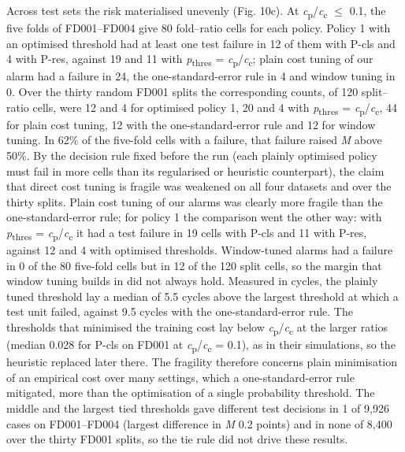 \documentclass[a4paper,fleqn,doubleblind]{cas-dc}
\begin{document}
Across test sets the risk materialised unevenly (Fig. 10c). At \textit{c}\textsubscript{p}/\textit{c}\textsubscript{c} $\le$ 0.1, the five folds of FD001--FD004 give 80 fold--ratio cells for each policy. Policy 1 with an optimised threshold had at least one test failure in 12 of them with P-cls and 4 with P-res, against 19 and 11 with \textit{p}\textsubscript{thres} = \textit{c}\textsubscript{p}/\textit{c}\textsubscript{c}; plain cost tuning of our alarm had a failure in 24, the one-standard-error rule in 4 and window tuning in 0. Over the thirty random FD001 splits the corresponding counts, of 120 split--ratio cells, were 12 and 4 for optimised policy 1, 20 and 4 with \textit{p}\textsubscript{thres} = \textit{c}\textsubscript{p}/\textit{c}\textsubscript{c}, 44 for plain cost tuning, 12 with the one-standard-error rule and 12 for window tuning. In 62\% of the five-fold cells with a failure, that failure raised \textit{M} above 50\%. By the decision rule fixed before the run (each plainly optimised policy must fail in more cells than its regularised or heuristic counterpart), the claim that direct cost tuning is fragile was weakened on all four datasets and over the thirty splits. Plain cost tuning of our alarms was clearly more fragile than the one-standard-error rule; for policy 1 the comparison went the other way: with \textit{p}\textsubscript{thres} = \textit{c}\textsubscript{p}/\textit{c}\textsubscript{c} it had a test failure in 19 cells with P-cls and 11 with P-res, against 12 and 4 with optimised thresholds. Window-tuned alarms had a failure in 0 of the 80 five-fold cells but in 12 of the 120 split cells, so the margin that window tuning builds in did not always hold. Measured in cycles, the plainly tuned threshold lay a median of 5.5 cycles above the largest threshold at which a test unit failed, against 9.5 cycles with the one-standard-error rule. The thresholds that minimised the training cost lay below \textit{c}\textsubscript{p}/\textit{c}\textsubscript{c} at the larger ratios (median 0.028 for P-cls on FD001 at \textit{c}\textsubscript{p}/\textit{c}\textsubscript{c} = 0.1), as in their simulations, so the heuristic replaced later there. The fragility therefore concerns plain minimisation of an empirical cost over many settings, which a one-standard-error rule mitigated, more than the optimisation of a single probability threshold. The middle and the largest tied thresholds gave different test decisions in 1 of 9,926 cases on FD001--FD004 (largest difference in \textit{M} 0.2 points) and in none of 8,400 over the thirty FD001 splits, so the tie rule did not drive these results.
\end{document}
